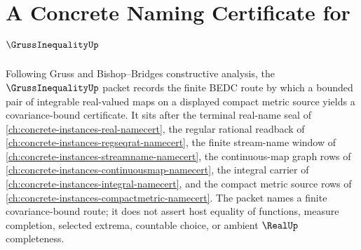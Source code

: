 \chapter{A Concrete Naming Certificate for $\GrussInequalityUp$}
\label{ch:concrete-instances-gruss-inequality-namecert}

Following Gruss and Bishop--Bridges constructive analysis, the $\GrussInequalityUp$ packet records the finite BEDC route by which a bounded pair of integrable real-valued maps on a displayed compact metric source yields a covariance-bound certificate. It sits after the terminal real-name seal of \autoref{ch:concrete-instances-real-namecert}, the regular rational readback of \autoref{ch:concrete-instances-regseqrat-namecert}, the finite stream-name window of \autoref{ch:concrete-instances-streamname-namecert}, the continuous-map graph rows of \autoref{ch:concrete-instances-continuousmap-namecert}, the integral carrier of \autoref{ch:concrete-instances-integral-namecert}, and the compact metric source rows of \autoref{ch:concrete-instances-compactmetric-namecert}. The packet names a finite covariance-bound route; it does not assert host equality of functions, measure completion, selected extrema, countable choice, or ambient $\RealUp$ completeness.

